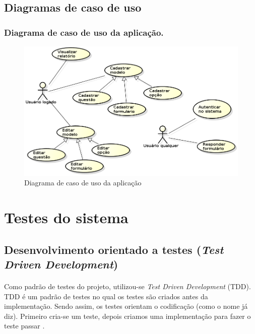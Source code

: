 \documentclass[11pt]{article}
\begin{document}
  \clearpage
        
  
    \subsection{Diagramas de caso de uso}
    
      \subsubsection{Diagrama de caso de uso da aplicação.}

        \begin{figure}[h!]
          \centering
          \includegraphics[width=1.0\textwidth]{uc_diagram.png}
          \caption{Diagrama de caso de uso da aplicação}
        \end{figure}
        
  \clearpage
      
  \section{Testes do sistema}
  
    \subsection{Desenvolvimento orientado a testes ({\em Test Driven Development})}
    
    \paragraph{}

    Como padrão de testes do projeto, utilizou-se {\em Test Driven 
    Development} (TDD). TDD é um padrão de testes no qual os testes são
    criados antes da implementação. Sendo assim, os testes orientam o
    codificação (como o nome já diz). Primeiro cria-se um teste, depois 
    criamos uma implementação para fazer o teste passar \cite{urubatan}.
     
\end{document}
